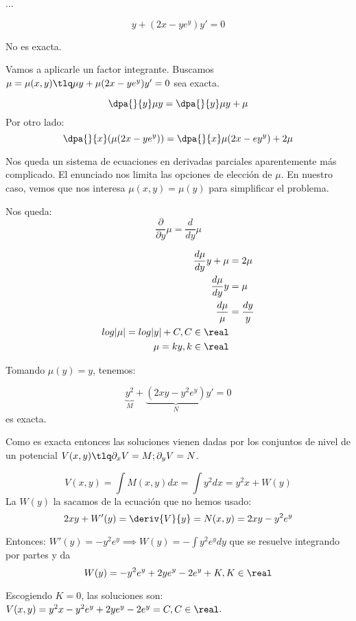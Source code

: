 \documentclass[nochap]{apuntes}
\begin{document}
\begin{problem}[12]
\ppart
\ppart
\ppart
\ppart ...

\solution

\spart

\spart

\spart

\spart \[y+(2x - ye^y)y' = 0\]

No es exacta. 

Vamos a aplicarle un factor integrante. Buscamos $\mu=\mu(x,y) \tlq \mu y+ \mu(2x-ye^y)y'=0$ sea exacta.

\[\dpa{}{y}\mu y = \dpa{}{y} \mu y + \mu\]
Por otro lado:
\[\dpa{}{x}(\mu(2x-ye^y)) = \dpa{}{x}\mu(2x-ey^y)+2\mu\]

Nos queda un sistema de ecuaciones en derivadas parciales aparentemente más complicado. El enunciado nos limita las opciones de elección de $\mu$. En nuestro caso, vemos que nos interesa $\mu(x,y) = \mu(y)$ para simplificar el problema.

Nos queda: \[\frac{\partial}{\partial y} \mu = \frac{d}{dy}\mu\]

\begin{align*}
\frac{d\mu}{dy}y+\mu&=2\mu\\
\frac{d\mu}{dy}y&=\mu\\
\frac{d\mu}{\mu} &= \frac{dy}{y}\\
log|\mu| = log|y| + C, C\in\real\\
\mu=ky,k\in\real
\end{align*}

Tomando $\mu(y)=y$, tenemos:

\[\underbrace{y^2}_{M}+\underbrace{(2xy-y^2e^y)}_{N}y'=0\] es exacta. 


Como es exacta entonces las soluciones vienen dadas por los conjuntos de nivel de un potencial $V(x,y) \tlq \partial_xV=M;\partial_yV=N$.

\[V(x,y) = \int M(x,y)dx = \int y^2 dx = y^2x + W(y)\]
La $W(y)$ la sacamos de la ecuación que no hemos usado:
\[2xy+W'(y) = \deriv{V}{y} = N(x,y) = 2xy-y^2e^y\]

Entonces: $W'(y) = -y^2e^y \implies W(y) =- \int y^2e^ydy$ que se resuelve integrando por partes y da \[W(y) = -y^2e^y + 2ye^y - 2e^y+K,K\in\real\]

Escogiendo $K=0$, las soluciones son: $V(x,y) = y^2x-y^2e^y + 2ye^y - 2e^y = C, C\in\real$.
\end{problem}
\end{document}
